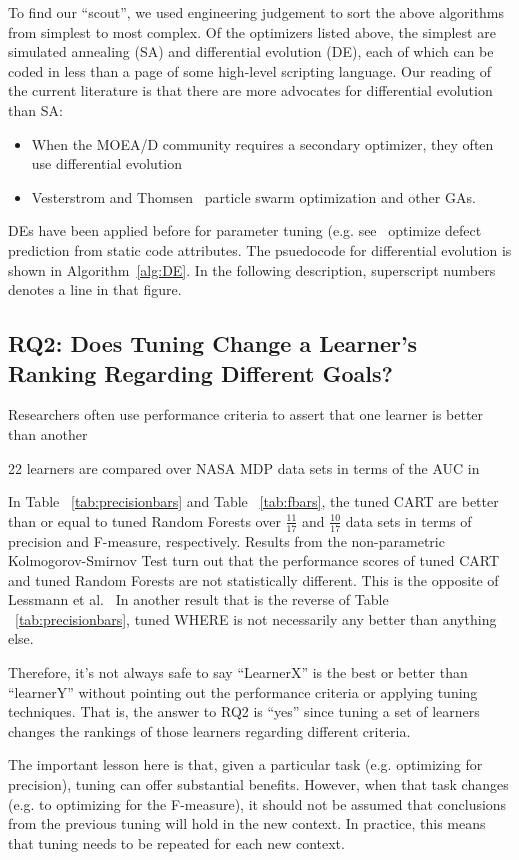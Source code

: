 \documentclass{sig-alternative}
\newcommand{\bi}{\begin{itemize}[leftmargin=0.4cm]}
\newcommand{\ei}{\end{itemize}}
\newcommand{\tab}[1]{Table ~\ref{tab:#1}}
\begin{document}
To find our ``scout'',  we used engineering judgement to sort  the above algorithms from simplest to most complex.
Of the optimizers listed above, the simplest are simulated annealing (SA)  and 
differential evolution (DE), each of which can be coded in less than a page of some high-level scripting language. Our reading of the current literature is that there are more  advocates for
differential evolution than
  SA:
  \bi
  \item
  When the MOEA/D community requires a secondary optimizer, they often use  differential evolution~
  \item
 Vesterstrom and Thomsen~
   particle swarm optimization and other GAs.
   \ei
DEs have been applied before for   parameter tuning (e.g. see~
optimize defect prediction from static code attributes.  
The psuedocode for differential evolution is shown in Algorithm~\ref{alg:DE}.
In the following description, 
    superscript numbers denotes a line in that figure.
 
\subsection{RQ2:  Does Tuning Change a Learner's Ranking Regarding Different Goals?}\label{sect:rank}
Researchers often use performance criteria to assert that one learner is better than another~

22 learners are compared over NASA MDP data sets in terms of the AUC in 

In \tab{precisionbars} and \tab{fbars}, the tuned CART are better than or equal to tuned Random Forests over $\frac{11}{17}$ and $\frac{10}{17}$ data sets in
terms of precision and F-measure, respectively. Results from the non-parametric Kolmogorov-Smirnov Test turn out that the performance 
scores of tuned CART and tuned Random Forests are not statistically different. This is the opposite of   
 Lessmann et al.~
 In another result that is the reverse of \tab{precisionbars}, tuned WHERE is not necessarily
 any better than anything else.
 
 Therefore, it's not always safe to say ``LearnerX'' is the best or better than ``learnerY'' without pointing out the performance criteria or applying tuning techniques. That is, the answer to RQ2 is ``yes'' since tuning a set of learners
 changes the rankings of those learners regarding different criteria.
 
The  important lesson here is that, given a particular task (e.g. optimizing for precision), tuning can offer
substantial benefits. However, when that task changes (e.g. to optimizing for the F-measure),
it should not be assumed that conclusions from the previous tuning will hold in the new context.
In practice, this means that tuning needs to be repeated for each new context.
\end{document}

